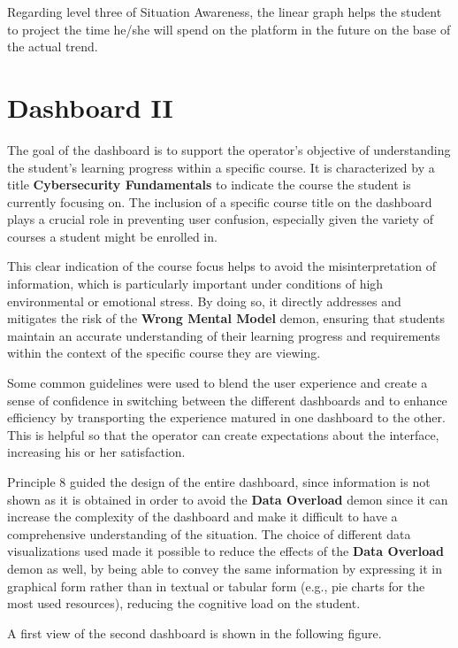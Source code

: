 Regarding level three of
Situation Awareness, the linear graph helps the student to project the time he/she will
spend on the platform in the future on the base of the actual trend.

\section{Dashboard II}

The goal of the dashboard is to support the operator's objective of understanding the student's learning progress within a specific course. It is characterized by a title \textbf{Cybersecurity Fundamentals} to indicate the course the student is currently focusing on. The inclusion of a specific course title on the dashboard plays a crucial role in preventing user confusion, especially given the variety of courses a student might be enrolled in. 

This clear indication of the course focus helps to avoid the misinterpretation of information, which is particularly important under conditions of high environmental or emotional stress. By doing so, it directly addresses and mitigates the risk of the \textbf{Wrong Mental Model} demon, ensuring that students maintain an accurate understanding of their learning progress and requirements within the context of the specific course they are viewing. 

Some common guidelines were used to blend the user experience and create a sense of confidence in switching between the different dashboards and to enhance efficiency by transporting the experience matured in one dashboard to the other. This is helpful so that the operator can create expectations about the interface, increasing his or her satisfaction.


Principle 8 guided the design of the entire dashboard, since information is not shown as it is obtained in order to avoid the \textbf{Data Overload} demon since it can increase the complexity of the dashboard and make it difficult to have a comprehensive understanding of the situation.
The choice of different data visualizations used made it possible to reduce the effects of the \textbf{Data Overload} demon as well, by being able to convey the same information by expressing it in graphical form rather than in textual or tabular form (e.g., pie charts for the most used resources), reducing the cognitive load on the student. 

A first view of the second dashboard is shown in the following figure.

